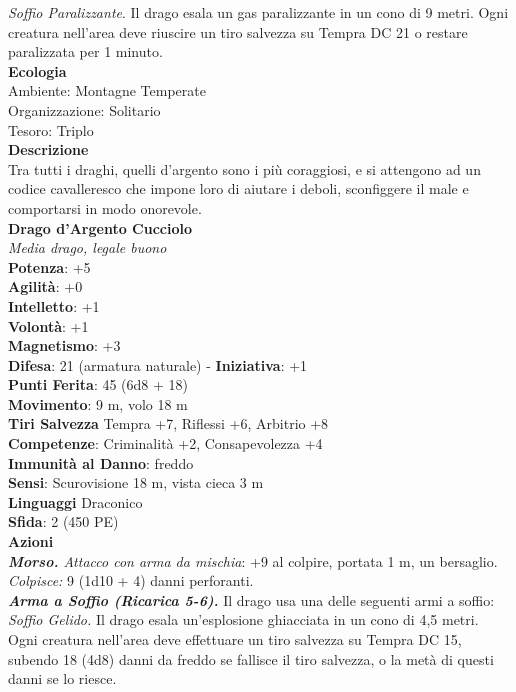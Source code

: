 \begin{multicols}{2}
\emph{Soffio Paralizzante}. Il drago esala un gas paralizzante in un cono di 9 metri. Ogni creatura nell'area deve riuscire un tiro salvezza su Tempra DC  21 o restare paralizzata per 1 minuto.\\
\textbf{Ecologia}\\
Ambiente: Montagne Temperate\\
Organizzazione: Solitario\\
Tesoro: Triplo\\
\textbf{Descrizione}\\
Tra tutti i draghi, quelli d’argento sono i più coraggiosi, e si attengono ad un codice cavalleresco che impone loro di aiutare i deboli, sconfiggere il male e comportarsi in modo onorevole.\\
\medskip\textbf{Drago d'Argento Cucciolo}\\
\emph{Media drago, legale buono}\\
\textbf{Potenza}: +5\\
\textbf{Agilità}: +0\\
\textbf{Intelletto}: +1\\
\textbf{Volontà}: +1\\
\textbf{Magnetismo}: +3\\
\textbf{Difesa}: 21 (armatura naturale) - \textbf{Iniziativa}: +1\\
\textbf{Punti Ferita}: 45 (6d8 + 18)\\
\textbf{Movimento}: 9 m, volo 18 m\\
\textbf{Tiri Salvezza} Tempra +7, Riflessi +6, Arbitrio +8\\
\textbf{Competenze}: Criminalità +2, Consapevolezza +4\\
\textbf{Immunità al Danno}: freddo\\
\textbf{Sensi}: Scurovisione 18 m, vista cieca 3 m\\
\textbf{Linguaggi} Draconico\\
\textbf{Sfida}: 2 (450 PE)\smallskip\\
\smallskip\textbf{Azioni}\\
\emph{\textbf{Morso.} Attacco con arma da mischia}: +9 al colpire, portata 1 m, un bersaglio.\\
\emph{Colpisce:} 9 (1d10 + 4) danni perforanti.\\
\emph{\textbf{Arma a Soffio (Ricarica 5-6).}} Il drago usa una delle seguenti armi a soffio:\\
\emph{Soffio Gelido.} Il drago esala un'esplosione ghiacciata in un cono di 4,5 metri. Ogni creatura nell'area deve effettuare un tiro salvezza su Tempra DC  15, subendo 18 (4d8) danni da freddo se fallisce il tiro salvezza, o la metà di questi danni se lo riesce.\\

\end{multicols}
